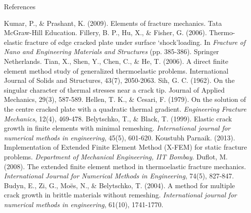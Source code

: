 \documentclass{beamer}
\begin{document}
\begin{frame}[t,fragile]{References}
    \tiny
\begin{thebibliography}{10}
       Kumar, P., \& Prashant, K. (2009). Elements of fracture mechanics. Tata McGraw-Hill Education.
       Fillery, B. P., Hu, X., \& Fisher, G. (2006). Thermo-elastic fracture of edge cracked plate under surface ‘shock’loading. In \emph{Fracture of Nano and Engineering Materials and Structures} (pp. 385-386). Springer Netherlands.
       Tian, X., Shen, Y., Chen, C., \& He, T. (2006). A direct finite element method study of generalized thermoelastic problems. International Journal of Solids and Structures, 43(7), 2050-2063.
       Sih, G. C. (1962). On the singular character of thermal stresses near a crack tip. Journal of Applied Mechanics, 29(3), 587-589.
       Hellen, T. K., \& Cesari, F. (1979). On the solution of the centre cracked plate with a quadratic thermal gradient. \emph{Engineering Fracture Mechanics}, 12(4), 469-478.
       Belytschko, T., \& Black, T. (1999). Elastic crack growth in finite elements with minimal remeshing. \emph{International journal for numerical methods in engineering}, 45(5), 601-620.
       Koustubh Parnaik. (2013). Implementation of Extended Finite Element Method (X-FEM) for static fracture problems. \emph{Department of Mechanical Engineering, IIT Bombay}.
      Duflot, M. (2008). The extended finite element method in thermoelastic fracture mechanics. \emph{International Journal for Numerical Methods in Engineering}, 74(5), 827-847.
      Budyn, E., Zi, G., Moës, N., \& Belytschko, T. (2004). A method for multiple crack growth in brittle materials without remeshing. \emph{International journal for numerical methods in engineering}, 61(10), 1741-1770.
\end{thebibliography}
\end{frame}
\end{document}
